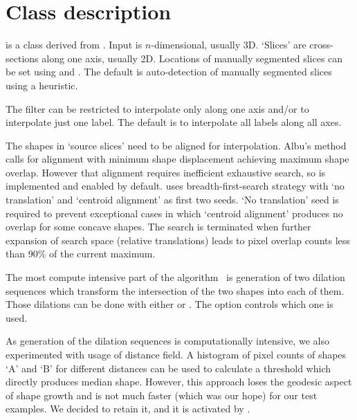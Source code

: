 \documentclass{InsightArticle}
\begin{document}
\section{Class description}

 is a class derived from
.
Input is $n$-dimensional, usually 3D.
`Slices' are cross-sections along one axis, usually 2D.
Locations of manually segmented slices can be set using
 and .
The default is auto-detection of manually segmented slices using a heuristic.

The filter can be restricted to interpolate only along one axis
and/or to interpolate just one label.
The default is to interpolate all labels along all axes.

The shapes in `source slices' need to be aligned for interpolation.
Albu's method calls for alignment with
minimum shape displacement achieving maximum shape overlap.
However that alignment requires inefficient exhaustive search,
so  is implemented and enabled by default.
 uses breadth-first-search strategy
with `no translation' and `centroid alignment' as first two seeds.
`No translation' seed is required to prevent exceptional cases in which
`centroid alignment' produces no overlap for some concave shapes.
The search is terminated when further expansion of search space
(relative translations) leads to pixel overlap counts
less than 90\% of the current maximum.

The most compute intensive part of the algorithm~\cite{Albu2008}
is generation of two dilation sequences which transform the intersection
of the two shapes into each of them.
Those dilations can be done with either 
or .
The option  controls which one is used.

As generation of the dilation sequences is computationally intensive,
we also experimented with usage of distance field.
A histogram of pixel counts of shapes `A' and `B' for different distances
can be used to calculate a threshold which directly produces median shape.
However, this approach loses the geodesic aspect of shape growth and
is not much faster (which was our hope) for our test examples.
We decided to retain it, and it is activated by .
\end{document}
